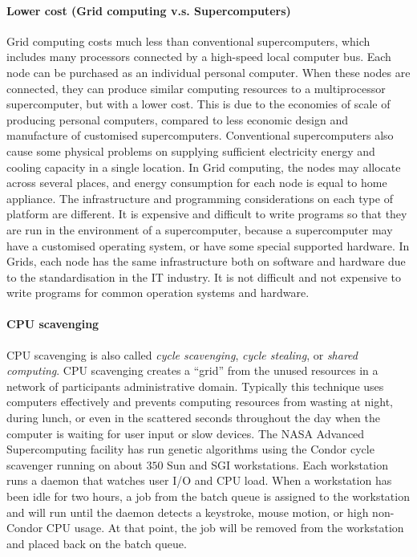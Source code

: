 \paragraph{Lower cost (Grid computing v.s. Supercomputers)}
Grid computing costs much less than conventional supercomputers, which includes many processors connected by a high-speed local computer bus. Each node can be purchased as an individual personal computer. When these nodes are connected, they can produce similar computing resources to a multiprocessor supercomputer, but with a lower cost. This is due to the economies of scale of producing personal computers, compared to less economic design and manufacture of customised supercomputers. Conventional supercomputers also cause some physical problems on supplying sufficient electricity energy and cooling capacity in a single location. In Grid computing, the nodes may allocate across several places, and energy consumption for each node is equal to home appliance. The infrastructure and programming considerations on each type of platform are different. It is expensive and difficult to write programs so that they are run in the environment of a supercomputer, because a supercomputer may have a customised operating system, or have some special supported hardware. In Grids, each node has the same infrastructure both on software and hardware due to the standardisation in the IT industry. It is not difficult and not expensive to write programs for common operation systems and hardware.

\paragraph{CPU scavenging}
CPU scavenging is also called \textit{cycle scavenging}, \textit{cycle stealing}, or \textit{shared computing}. CPU scavenging creates a ``grid'' from the unused resources in a network of participants administrative domain. Typically this technique uses computers effectively and prevents computing resources from wasting at night, during lunch, or even in the scattered seconds throughout the day when the computer is waiting for user input or slow devices. The NASA Advanced Supercomputing facility has run genetic algorithms using the Condor cycle scavenger running on about $350$ Sun and SGI workstations. Each workstation runs a daemon that watches user I/O and CPU load. When a workstation has been idle for two hours, a job from the batch queue is assigned to the workstation and will run until the daemon detects a keystroke, mouse motion, or high non-Condor CPU usage. At that point, the job will be removed from the workstation and placed back on the batch queue.

